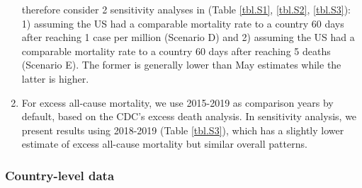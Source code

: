 \documentclass[
]{article}
\begin{document}
\begin{enumerate}
  therefore consider 2 sensitivity analyses in (Table \ref{tbl.S1},
  \ref{tbl.S2}, \ref{tbl.S3}): 1) assuming the US had a comparable
  mortality rate to a country 60 days after reaching 1 case per million
  (Scenario D) and 2) assuming the US had a comparable mortality rate to
  a country 60 days after reaching 5 deaths (Scenario E). The former is
  generally lower than May estimates while the latter is higher.
\item
  For excess all-cause mortality, we use 2015-2019 as comparison years
  by default, based on the CDC's excess death analysis. In sensitivity
  analysis, we present results using 2018-2019 (Table \ref{tbl.S3}),
  which has a slightly lower estimate of excess all-cause mortality but
  similar overall patterns.
\end{enumerate}

\bigskip

\hypertarget{country-level-data}{%
\subsubsection{Country-level data}\label{country-level-data}}
\end{document}
